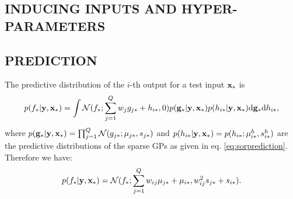
\subsection{INDUCING INPUTS AND HYPER-PARAMETERS \label{sec:hyperparameters}}
\subsection{PREDICTION}
The predictive distribution of the $i$-th output for a test input $\mathbf{x}_*$ is 
\begin{align}
p(f_* | \mathbf{y}, \mathbf{x}_*) = \int \mathcal{N}(f_*; \sum_{j=1}^Q w_j g_{j*} + h_{i*}, 0) p(\mathbf{g}_* | \mathbf{y}, \mathbf{x}_*) p(h_{i*} | \mathbf{y}, \mathbf{x}_*) \mathrm{d} \mathbf{g}_* \mathrm{d} h_{i*},
\end{align}
where $p(\mathbf{g}_* | \mathbf{y}, \mathbf{x}_*) = \prod_{j=1}^Q \mathcal{N}(g_{j*}; \mu_{j*}, s_{j*})$ and $p(h_{i*} | \mathbf{y}, \mathbf{x}_*) = p(h_{i*}; \mu^h_{i*}, s^h_{i*})$ are the predictive distributions of the sparse GPs as given in eq. \ref{eq:sorprediction}.
Therefore we have:
\begin{align}
p(f_* | \mathbf{y}, \mathbf{x}_*) = \mathcal{N}(f_*; \sum_{j=1}^Q w_{ij} \mu_{j*} + \mu_{i*}, w_{ij}^2 s_{j*} + s_{i*}). 
\end{align}


